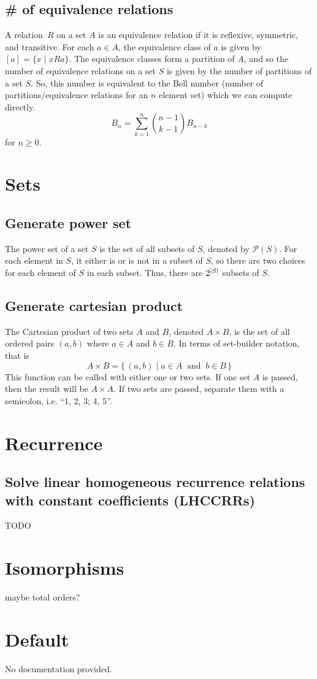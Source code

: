 \documentclass{article}
\begin{document}
\subsection{\# of equivalence relations}
A relation $R$ on a set $A$ is an equivalence relation if it is reflexive, symmetric, and transitive. For each $a \in A$, the equivalence class of $a$ is given by $[a] = \{x \mid xRa\}$. The equivalence classes form a partition of $A$, and so the number of equivalence relations on a set $S$ is given by the number of partitions of a set $S$. So, this number is equivalent to the Bell number (number of partitions/equivalence relations for an $n$ element set) which we can compute directly.
\[B_n = \sum_{k=1}^{n} {n-1 \choose k-1} B_{n-k}\]
for $n \ge 0$.

\newpage
\section{Sets}
\subsection{Generate power set}
The power set of a set $S$ is the set of all subsets of $S$, denoted by $\mathcal P(S)$. For each element in $S$, it either is or is not in a subset of $S$, so there are two choices for each element of $S$ in each subset. Thus, there are $2^{\,\abs{S}}$ subsets of $S$.
\subsection{Generate cartesian product}
The Cartesian product of two sets $A$ and $B$, denoted $A \times B$, is the set of all ordered pairs $(a, b)$ where $a \in A$ and $b \in B$. In terms of set-builder notation, that is
\[A\times B=\{\,(a,b)\mid a\in A\ {\mbox{ and }}\ b\in B\,\}\]
This function can be called with either one or two sets. If one set $A$ is passed, then the result will be $A \times A$. If two sets are passed, separate them with a semicolon, i.e. ``1, 2, 3; 4, 5''.

\section{Recurrence}
\subsection{Solve linear homogeneous recurrence relations with constant coefficients (LHCCRRs)}
TODO

\section{Isomorphisms}
maybe total orders?

\section{Default}
No documentation provided.
\end{document}
